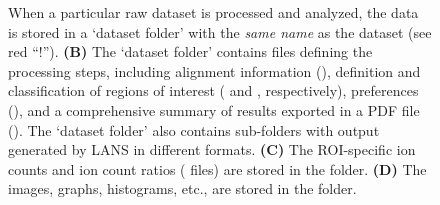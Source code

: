 \begin{figure}[!hb]
{  When a particular raw dataset is processed and analyzed, the data is stored in a `dataset folder' with the \emph{same name} as the dataset (see red ``!''). %
  \textbf{(B)} The `dataset folder' contains files defining the processing steps, including alignment information (), definition and classification of regions of interest ( and , respectively), preferences (), and a comprehensive summary of results exported in a PDF file (). %
  The `dataset folder' also contains sub-folders with output generated by LANS in different formats. %
    \textbf{(C)} The ROI-specific ion counts and ion count ratios ( files) are stored in the  folder. %
    \textbf{(D)} The images, graphs, histograms, etc., are stored in the  folder.}%
\end{figure}
